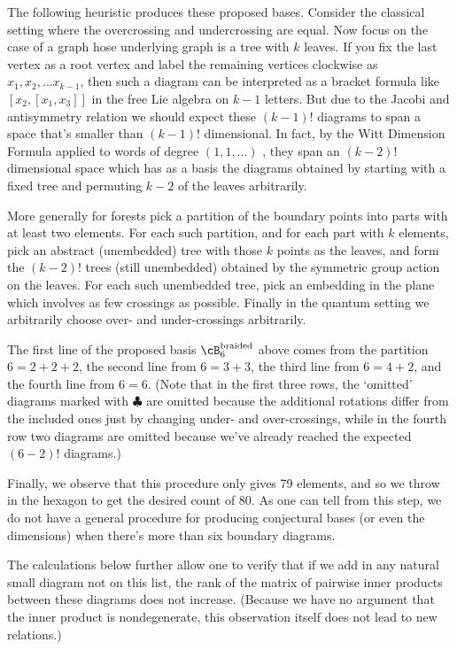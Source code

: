 \documentclass[12pt]{amsart}
\begin{document}
The following heuristic produces these proposed bases.  Consider the classical
setting where the overcrossing and undercrossing are equal.  Now focus on the case
of a graph hose underlying graph is a tree with $k$ leaves.  If you fix the last vertex 
as a root vertex and label the remaining vertices clockwise as $x_1, x_2, \ldots x_{k-1}$, 
then such a diagram can be interpreted as a bracket formula like $[x_2,[x_1, x_3]]$ in
the free Lie algebra on $k-1$ letters.  But due to the Jacobi and antisymmetry relation we should expect these
$(k-1)!$ diagrams to span a space that's smaller than $(k-1)!$ dimensional.  In fact, by 
the Witt Dimension Formula applied to words of degree $(1,1,\ldots)$ \cite[Satz 3]{MR1581553}, they span an $(k-2)!$ dimensional space which has as a basis
the diagrams obtained by starting with a fixed tree and permuting $k-2$ of the leaves arbitrarily.

More generally for forests pick a partition of the boundary points into parts with 
at least two elements. For each such partition, and for each part with $k$ elements, 
pick an abstract (unembedded) tree with those $k$ points as the leaves, and form 
the $(k-2)!$ trees (still unembedded) obtained by the symmetric group action on the leaves.
For each such unembedded tree, pick an embedding in the plane which involves as few crossings
as possible.  Finally in the quantum setting we arbitrarily choose over- and under-crossings arbitrarily.

The first line of the proposed basis $\cB^{\text{braided}}_6$ above comes from the partition $6=2+2+2$,
the second line from $6=3+3$, the third line from $6=4+2$, and the fourth line from $6=6$.
(Note that in the first three rows, the `omitted' diagrams marked with $\clubsuit$ are omitted because the additional rotations differ from the included ones just by changing under- and over-crossings, while in the fourth row two diagrams are omitted because we've already reached the expected $(6-2)!$ diagrams.)

Finally, we observe that this procedure only gives 79 elements, and so we throw in the hexagon to get the desired
count of 80.  As one can tell from this step, we do not have a general procedure for producing conjectural
bases (or even the dimensions) when there's more than six boundary diagrams.

The calculations below further allow one to verify that if we add in any natural small diagram not on this list,
the rank of the matrix of pairwise inner products between these diagrams does not increase. (Because we 
have no argument that the inner product is nondegenerate, this observation itself does not lead to new relations.)
\end{document}

